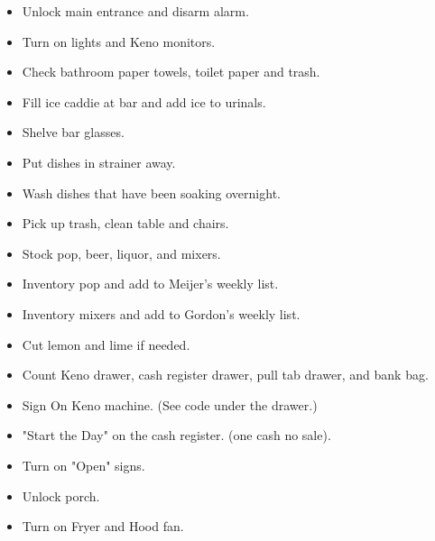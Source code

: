 \documentclass[a0,landscape]{a0poster}
\begin{document}
\begin{multicols}{4}
\begin{itemize}
\item Unlock main entrance and disarm alarm. 
\item Turn on lights and Keno monitors. 
\item Check bathroom paper towels, toilet paper and trash. 
\item Fill ice caddie at bar and add ice to urinals. 
\item Shelve bar glasses. 
\item Put dishes in strainer away. 
\item Wash dishes that have been soaking overnight. 
\item Pick up trash, clean table and chairs. 
\item Stock pop, beer, liquor, and mixers. 
\item Inventory pop and add to Meijer's weekly list. 
\item Inventory mixers and add to Gordon's weekly list. 
\item Cut lemon and lime if needed. 
\item Count Keno drawer, cash register drawer, pull tab drawer, and bank bag. 
\item Sign On Keno machine. (See code under the drawer.) 
\item "Start the Day" on the cash register. (one cash no sale). 
\item Turn on "Open" signs. 
\item Unlock porch. 
\item Turn on Fryer and Hood fan.
\end{itemize}



\end{multicols}
\end{document}
